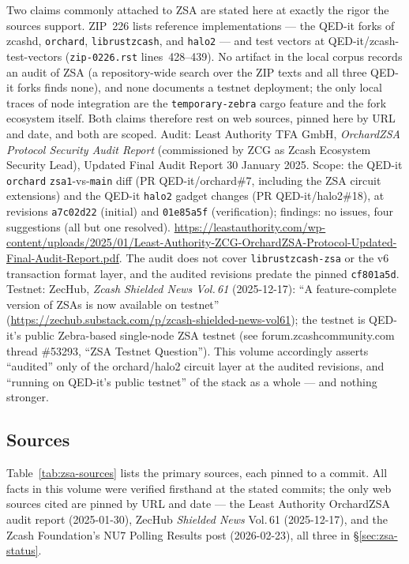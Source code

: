\documentclass[11pt,a4paper]{article}
\theoremstyle{definition}
\begin{document}
Two claims commonly attached to ZSA are stated here at exactly the rigor the
sources support. ZIP~226 lists reference implementations --- the
QED-it forks of zcashd, \texttt{orchard}, \texttt{librustzcash}, and
\texttt{halo2} --- and test vectors at QED-it/zcash-test-vectors
(\texttt{zip-0226.rst} lines~428--439). No artifact in the local corpus
records an audit of ZSA (a repository-wide search over the ZIP texts and all
three QED-it forks finds none), and none documents a testnet deployment; the
only local traces of node integration are the \texttt{temporary-zebra} cargo
feature and the fork ecosystem itself. Both claims therefore rest on web
sources, pinned here by URL and date, and both are scoped. Audit: Least
Authority TFA GmbH, \emph{OrchardZSA Protocol Security Audit Report}
(commissioned by ZCG as Zcash Ecosystem Security Lead), Updated Final Audit
Report 30 January 2025. Scope: the QED-it \texttt{orchard}
\texttt{zsa1}-vs-\texttt{main} diff (PR QED-it/orchard\#7, including the ZSA
circuit extensions) and the QED-it \texttt{halo2} gadget changes (PR
QED-it/halo2\#18), at revisions \texttt{a7c02d22} (initial) and
\texttt{01e85a5f} (verification); findings: no issues, four suggestions (all
but one resolved).
\url{https://leastauthority.com/wp-content/uploads/2025/01/Least-Authority-ZCG-OrchardZSA-Protocol-Updated-Final-Audit-Report.pdf}.
The audit does not cover \texttt{librustzcash-zsa} or the v6 transaction
format layer, and the audited revisions predate the pinned
\texttt{cf801a5d}. Testnet: ZecHub, \emph{Zcash Shielded News Vol.\,61}
(2025-12-17): ``A feature-complete version of ZSAs is now available on
testnet'' (\url{https://zechub.substack.com/p/zcash-shielded-news-vol61});
the testnet is QED-it's public Zebra-based single-node ZSA testnet (see
forum.zcashcommunity.com thread \#53293, ``ZSA Testnet Question''). This
volume accordingly asserts ``audited'' only of the orchard/halo2 circuit
layer at the audited revisions, and ``running on QED-it's public testnet''
of the stack as a whole --- and nothing stronger.

\subsection{Sources}\label{sec:zsa-sources}

Table~\ref{tab:zsa-sources} lists the primary sources, each pinned to a
commit. All facts in this volume were verified firsthand at the stated
commits; the only web sources cited are pinned by URL and date --- the Least
Authority OrchardZSA audit report (2025-01-30), ZecHub \emph{Shielded News}
Vol.\,61 (2025-12-17), and the Zcash Foundation's NU7 Polling Results post
(2026-02-23), all three in \S\ref{sec:zsa-status}.
\end{document}
